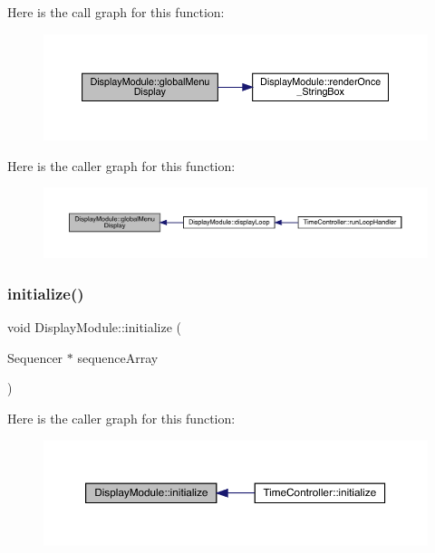 Here is the call graph for this function\+:
\nopagebreak
\begin{figure}[H]
\begin{center}
\leavevmode
\includegraphics[width=350pt]{class_display_module_a5082cabe11332dc4a9d0daea8a60f9dc_cgraph}
\end{center}
\end{figure}
Here is the caller graph for this function\+:
\nopagebreak
\begin{figure}[H]
\begin{center}
\leavevmode
\includegraphics[width=350pt]{class_display_module_a5082cabe11332dc4a9d0daea8a60f9dc_icgraph}
\end{center}
\end{figure}
\mbox{\label{class_display_module_a68451c130f98f5d820377e9aa15a7242}} 
\subsubsection{\texorpdfstring{initialize()}{initialize()}}
{\footnotesize\ttfamily void Display\+Module\+::initialize (\begin{DoxyParamCaption}\item[{Sequencer $\ast$}]{sequence\+Array }\end{DoxyParamCaption})}

Here is the caller graph for this function\+:
\nopagebreak
\begin{figure}[H]
\begin{center}
\leavevmode
\includegraphics[width=350pt]{class_display_module_a68451c130f98f5d820377e9aa15a7242_icgraph}
\end{center}
\end{figure}
\mbox{\label{class_display_module_a776e918a0d9f50ae079d6839524cc471}} 

